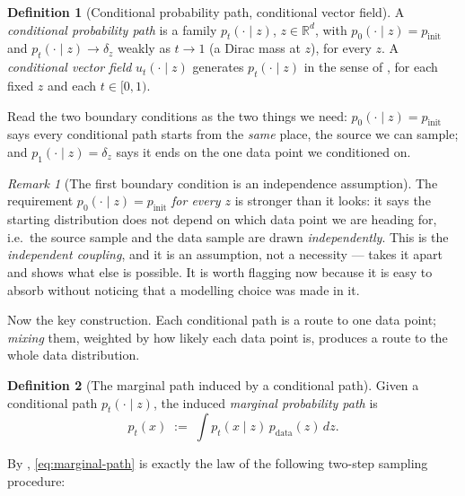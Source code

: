 \documentclass[11pt,a4paper]{report}
\theoremstyle{definition}
\newtheorem{definition}[definition]{Definition}
\theoremstyle{remark}
\newtheorem{remark}[remark]{Remark}
\newcommand{\RR}{\mathbb R}
\begin{document}
\begin{definition}[Conditional probability path, conditional vector field]
\label{def:cond-path-cfm}
A \emph{conditional probability path} is a family $p_t(\cdot\mid z)$,
$z\in\RR^d$, with $p_0(\cdot\mid z)=p_{\mathrm{init}}$ and
$p_t(\cdot\mid z)\to\delta_z$ weakly as $t\to1$ (a Dirac mass at $z$), for
every $z$. A \emph{conditional vector field} $u_t(\cdot\mid z)$ generates
$p_t(\cdot\mid z)$ in the sense of , for each fixed
$z$ and each $t\in[0,1)$.
\end{definition}

Read the two boundary conditions as the two things we need:
$p_0(\cdot\mid z)=p_{\mathrm{init}}$ says every conditional path starts
from the \emph{same} place, the source we can sample; and
$p_1(\cdot\mid z)=\delta_z$ says it ends on the one data point we
conditioned on.

\begin{remark}[The first boundary condition is an independence assumption]
\label{rem:independent-coupling-hidden}
The requirement $p_0(\cdot\mid z)=p_{\mathrm{init}}$ \emph{for every $z$}
is stronger than it looks: it says the starting distribution does not
depend on which data point we are heading for, i.e.\ the source sample and
the data sample are drawn \emph{independently}. This is the
\emph{independent coupling}, and it is an assumption, not a necessity ---
 takes it apart and shows what else is possible. It
is worth flagging now because it is easy to absorb
 without noticing that a modelling choice was made
in it.
\end{remark}

Now the key construction. Each conditional path is a route to one data
point; \emph{mixing} them, weighted by how likely each data point is,
produces a route to the whole data distribution.

\begin{definition}[The marginal path induced by a conditional path]
\label{def:marginal-path}
Given a conditional path $p_t(\cdot\mid z)$, the induced \emph{marginal
probability path} is
\begin{equation}
\label{eq:marginal-path}
p_t(x) \;:=\; \int p_t(x\mid z)\,p_{\mathrm{data}}(z)\,dz .
\end{equation}
\end{definition}

By , \eqref{eq:marginal-path} is exactly the law
of the following two-step sampling procedure:
\end{document}
